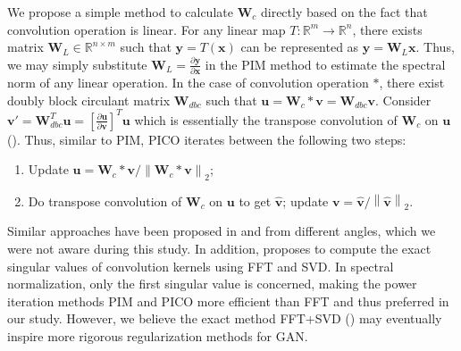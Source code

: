\documentclass{article} %
\theoremstyle{plain}
\newtheorem*{proposition 1*}{Proposition 1}
\newcommand\norm[1]{\left\lVert#1\right\rVert}
\newcommand{\set}[1]{\mathbb{#1}}  %
\begin{document}
\begin{appendices}
We propose a simple method to calculate \(\bm{W}_{c}\) directly based on the fact that convolution operation is linear. For any linear map \(T:\set{R}^m\to\set{R}^n\), there exists matrix \(\bm{W}_L\in\set{R}^{n\times m}\) such that \(\bm{y}=T(\bm{x})\) can be represented as \(\bm{y}=\bm{W}_L\bm{x}\). Thus, we may simply substitute \(\bm{W}_L=\frac{\partial\bm{y}}{\partial\bm{x}}\) in the PIM method to estimate the spectral norm of any linear operation. In the case of convolution operation \(*\), there exist doubly block circulant matrix \(\bm{W}_{dbc}\) such that \(\bm{u}=\bm{W}_c*\bm{v}=\bm{W}_{dbc}\bm{v}\). Consider \(\bm{v}'=\bm{W}_{dbc}^T\bm{u}=[\frac{\partial\bm{u}}{\partial\bm{v}}]^T\bm{u}\) which is essentially the transpose convolution of \(\bm{W}_c\) on \(\bm{u}\) (\cite{conv_guide}). Thus, similar to PIM, PICO iterates between the following two steps:
\begin{enumerate}[leftmargin=*]
	\item Update \(\bm{u}=\bm{W}_c*\bm{v}/\norm{\bm{W}_c*\bm{v}}_2\);
	\item Do transpose convolution of \(\bm{W}_c\) on \(\bm{u}\) to get \(\hat{\bm{v}}\); update \(\bm{v}=\hat{\bm{v}}/\norm{\hat{\bm{v}}}_2\).
\end{enumerate}
Similar approaches have been proposed in \cite{pico_similar} and \cite{pico_similar2} from different angles, which we were not aware during this study. In addition, \cite{fft_sv} proposes to compute the exact singular values of convolution kernels using FFT and SVD. In spectral normalization, only the first singular value is concerned, making the power iteration methods PIM and PICO more efficient than FFT and thus preferred in our study. However, we believe the exact method FFT+SVD (\cite{fft_sv}) may eventually inspire more rigorous regularization methods for GAN.


\end{appendices}
\end{document}
